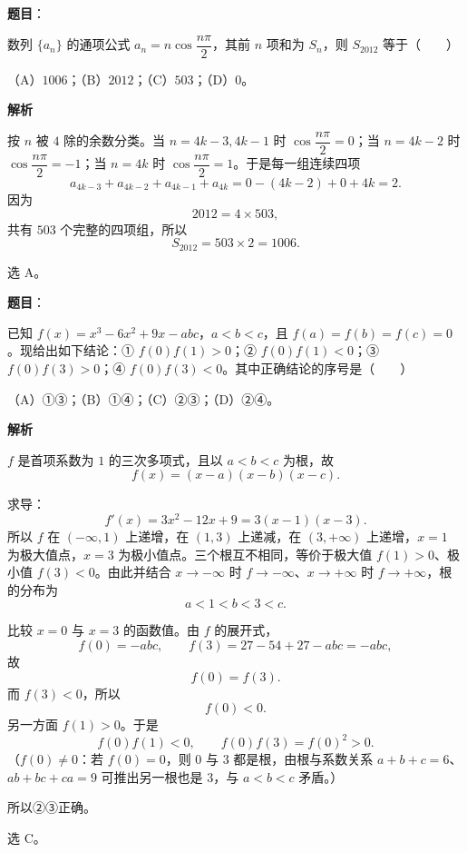 \begin{answer}

\textbf{题目}：

数列 $\{a_n\}$ 的通项公式 $a_n=n\cos\dfrac{n\pi}{2}$，其前 $n$ 项和为 $S_n$，则 $S_{2012}$ 等于\mbox{（　　）}

（A）$1006$；（B）$2012$；（C）$503$；（D）$0$。

\textbf{解析}

按 $n$ 被 $4$ 除的余数分类。当 $n=4k-3,4k-1$ 时 $\cos\dfrac{n\pi}{2}=0$；当 $n=4k-2$ 时 $\cos\dfrac{n\pi}{2}=-1$；当 $n=4k$ 时 $\cos\dfrac{n\pi}{2}=1$。于是每一组连续四项
\nopagebreak[4]
\[a_{4k-3}+a_{4k-2}+a_{4k-1}+a_{4k}=0-(4k-2)+0+4k=2.\]
因为
\nopagebreak[4]
\[2012=4\times503,\]
共有 $503$ 个完整的四项组，所以
\nopagebreak[4]
\[S_{2012}=503\times2=1006.\]

选 A。


\end{answer}
\begin{answer}

\textbf{题目}：

已知 $f(x)=x^3-6x^2+9x-abc$，$a<b<c$，且 $f(a)=f(b)=f(c)=0$。现给出如下结论：① $f(0)f(1)>0$；② $f(0)f(1)<0$；③ $f(0)f(3)>0$；④ $f(0)f(3)<0$。其中正确结论的序号是\mbox{（　　）}

（A）①③；（B）①④；（C）②③；（D）②④。

\textbf{解析}

$f$ 是首项系数为 $1$ 的三次多项式，且以 $a<b<c$ 为根，故
\nopagebreak[4]
\[f(x)=(x-a)(x-b)(x-c).\]

求导：
\nopagebreak[4]
\[f'(x)=3x^2-12x+9=3(x-1)(x-3).\]
所以 $f$ 在 $(-\infty,1)$ 上递增，在 $(1,3)$ 上递减，在 $(3,+\infty)$ 上递增，$x=1$ 为极大值点，$x=3$ 为极小值点。三个根互不相同，等价于极大值 $f(1)>0$、极小值 $f(3)<0$。由此并结合 $x\to-\infty$ 时 $f\to-\infty$、$x\to+\infty$ 时 $f\to+\infty$，根的分布为
\nopagebreak[4]
\[a<1<b<3<c.\]

比较 $x=0$ 与 $x=3$ 的函数值。由 $f$ 的展开式，
\nopagebreak[4]
\[f(0)=-abc,\qquad f(3)=27-54+27-abc=-abc,\]
故
\nopagebreak[4]
\[f(0)=f(3).\]
而 $f(3)<0$，所以
\nopagebreak[4]
\[f(0)<0.\]
另一方面 $f(1)>0$。于是
\nopagebreak[4]
\[f(0)f(1)<0,\qquad f(0)f(3)=f(0)^2>0.\]
（$f(0)\neq0$：若 $f(0)=0$，则 $0$ 与 $3$ 都是根，由根与系数关系 $a+b+c=6$、$ab+bc+ca=9$ 可推出另一根也是 $3$，与 $a<b<c$ 矛盾。）

所以②③正确。

选 C。


\end{answer}
